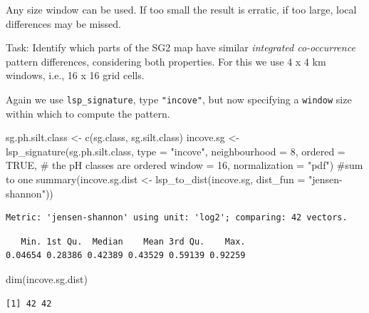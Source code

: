 \documentclass[
  letterpaper,
  DIV=11,
  numbers=noendperiod]{scrartcl}
\newenvironment{Shaded}{\begin{snugshade}}{\end{snugshade}}
\newcommand{\AttributeTok}[1]{\textcolor[rgb]{0.40,0.45,0.13}{#1}}
\newcommand{\CommentTok}[1]{\textcolor[rgb]{0.37,0.37,0.37}{#1}}
\newcommand{\ConstantTok}[1]{\textcolor[rgb]{0.56,0.35,0.01}{#1}}
\newcommand{\DecValTok}[1]{\textcolor[rgb]{0.68,0.00,0.00}{#1}}
\newcommand{\FunctionTok}[1]{\textcolor[rgb]{0.28,0.35,0.67}{#1}}
\newcommand{\NormalTok}[1]{\textcolor[rgb]{0.00,0.23,0.31}{#1}}
\newcommand{\OtherTok}[1]{\textcolor[rgb]{0.00,0.23,0.31}{#1}}
\newcommand{\StringTok}[1]{\textcolor[rgb]{0.13,0.47,0.30}{#1}}
\begin{document}
Any size window can be used. If too small the result is erratic, if too
large, local differences may be missed.

Task: Identify which parts of the SG2 map have similar \emph{integrated
co-occurrence} pattern differences, considering both properties. For
this we use 4 x 4 km windows, i.e., 16 x 16 grid cells.

Again we use \texttt{lsp\_signature}, type \texttt{"incove"}, but now
specifying a \texttt{window} size within which to compute the pattern.

\begin{Shaded}
\begin{Highlighting}[]
\NormalTok{sg.ph.silt.class }\OtherTok{\textless{}{-}} \FunctionTok{c}\NormalTok{(sg.class, sg.silt.class)}
\NormalTok{incove.sg }\OtherTok{\textless{}{-}} \FunctionTok{lsp\_signature}\NormalTok{(sg.ph.silt.class,}
                              \AttributeTok{type =} \StringTok{"incove"}\NormalTok{,}
                              \AttributeTok{neighbourhood =} \DecValTok{8}\NormalTok{,}
                              \AttributeTok{ordered =} \ConstantTok{TRUE}\NormalTok{,  }\CommentTok{\# the pH classes are ordered}
                              \AttributeTok{window =} \DecValTok{16}\NormalTok{,}
                              \AttributeTok{normalization =} \StringTok{"pdf"}\NormalTok{)  }\CommentTok{\#sum to one}
\FunctionTok{summary}\NormalTok{(incove.sg.dist }\OtherTok{\textless{}{-}} \FunctionTok{lsp\_to\_dist}\NormalTok{(incove.sg,}
                                 \AttributeTok{dist\_fun =} \StringTok{"jensen{-}shannon"}\NormalTok{))}
\end{Highlighting}
\end{Shaded}

\begin{verbatim}
Metric: 'jensen-shannon' using unit: 'log2'; comparing: 42 vectors.
\end{verbatim}

\begin{verbatim}
   Min. 1st Qu.  Median    Mean 3rd Qu.    Max. 
0.04654 0.28386 0.42389 0.43529 0.59139 0.92259 
\end{verbatim}

\begin{Shaded}
\begin{Highlighting}[]
\FunctionTok{dim}\NormalTok{(incove.sg.dist)}
\end{Highlighting}
\end{Shaded}

\begin{verbatim}
[1] 42 42
\end{verbatim}
\end{document}
